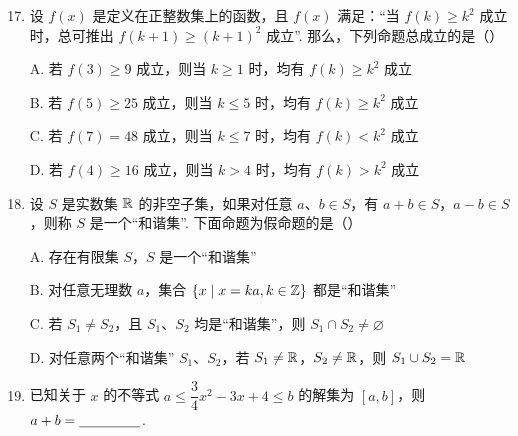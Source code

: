 \documentclass[a4paper,11pt]{article}
\begin{document}
\begin{enumerate}
\setcounter{enumi}{16}

\item 设 $f(x)$ 是定义在正整数集上的函数，且 $f(x)$ 满足：“当 $f(k)\geqslant k^2$ 成立时，总可推出 $f(k+1)\geqslant(k+1)^2$ 成立”. 那么，下列命题总成立的是\mbox{（\quad）}

\keepwithprev
A. 若 $f(3)\geqslant9$ 成立，则当 $k\geqslant1$ 时，均有 $f(k)\geqslant k^2$ 成立

B. 若 $f(5)\geqslant25$ 成立，则当 $k\leqslant5$ 时，均有 $f(k)\geqslant k^2$ 成立

C. 若 $f(7)=48$ 成立，则当 $k\leqslant7$ 时，均有 $f(k)<k^2$ 成立

D. 若 $f(4)\geqslant16$ 成立，则当 $k>4$ 时，均有 $f(k)>k^2$ 成立

\ifanswer
{}
\fi

\item 设 $S$ 是实数集 $\R$ 的非空子集，如果对任意 $a$、$b\in S$，有 $a+b\in S$，$a-b\in S$，则称 $S$ 是一个“和谐集”. 下面命题为假命题的是\mbox{（\quad）}

\keepwithprev
A. 存在有限集 $S$，$S$ 是一个“和谐集”

B. 对任意无理数 $a$，集合 $\{x\mid x=ka,k\in\Z\}$ 都是“和谐集”

C. 若 $S_1\neq S_2$，且 $S_1$、$S_2$ 均是“和谐集”，则 $S_1\cap S_2\neq\varnothing$

D. 对任意两个“和谐集” $S_1$、$S_2$，若 $S_1\neq\R$，$S_2\neq\R$，则 $S_1\cup S_2=\R$

\ifanswer
\solbegin
{}
\solend
\fi

\item 已知关于 $x$ 的不等式 $a\leqslant\dfrac34x^2-3x+4\leqslant b$ 的解集为 $[a,b]$，则 $a+b=\blankline[4.4em]$.

\ifanswer
\solbegin
{}
\solend
\fi


\end{enumerate}
\end{document}
